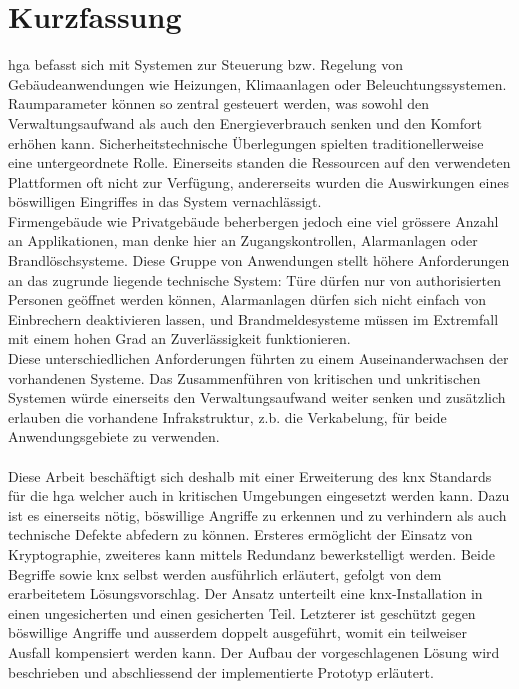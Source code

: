 \chapter*{Kurzfassung}
\gls{hga} befasst sich mit Systemen zur Steuerung bzw. Regelung von Gebäudeanwendungen wie Heizungen, Klimaanlagen oder Beleuchtungssystemen. Raumparameter
können so zentral gesteuert werden, was sowohl den Verwaltungsaufwand als auch den Energieverbrauch senken und den Komfort erhöhen kann. 
Sicherheitstechnische Überlegungen spielten traditionellerweise eine untergeordnete Rolle.
Einerseits standen die Ressourcen auf den verwendeten Plattformen oft nicht zur Verfügung, andererseits wurden die Auswirkungen eines böswilligen Eingriffes in das System vernachlässigt.
\\
Firmengebäude wie Privatgebäude beherbergen jedoch eine viel grössere Anzahl an Applikationen, man denke hier an Zugangskontrollen, 
Alarmanlagen oder Brandlöschsysteme. Diese Gruppe von Anwendungen stellt höhere Anforderungen an das zugrunde liegende technische System:
Türe dürfen nur von authorisierten Personen geöffnet werden können, Alarmanlagen dürfen sich nicht einfach von Einbrechern deaktivieren lassen, und Brandmeldesysteme müssen im
Extremfall mit einem hohen Grad an Zuverlässigkeit funktionieren. 
\\
Diese unterschiedlichen Anforderungen führten zu einem Auseinanderwachsen der vorhandenen Systeme. Das Zusammenführen 
von kritischen und unkritischen Systemen würde einerseits den Verwaltungsaufwand weiter senken und zusätzlich erlauben die vorhandene Infrakstruktur, z.b. die Verkabelung,
für beide Anwendungsgebiete zu verwenden.
\\
\\
Diese Arbeit beschäftigt sich deshalb mit einer Erweiterung des \gls{knx} Standards für die \gls{hga} welcher auch in kritischen Umgebungen eingesetzt werden kann.
Dazu ist es einerseits nötig, böswillige Angriffe zu erkennen und zu verhindern als auch technische Defekte abfedern zu können. Ersteres ermöglicht der Einsatz von Kryptographie,
zweiteres kann mittels Redundanz bewerkstelligt werden. Beide Begriffe sowie \gls{knx} selbst werden ausführlich erläutert, gefolgt von dem erarbeitetem Lösungsvorschlag.
Der Ansatz unterteilt eine \gls{knx}-Installation in einen ungesicherten und einen gesicherten Teil. Letzterer ist geschützt gegen böswillige Angriffe und ausserdem doppelt ausgeführt,
womit ein teilweiser Ausfall kompensiert werden kann. Der Aufbau der vorgeschlagenen Lösung wird beschrieben und abschliessend der implementierte Prototyp erläutert. 
